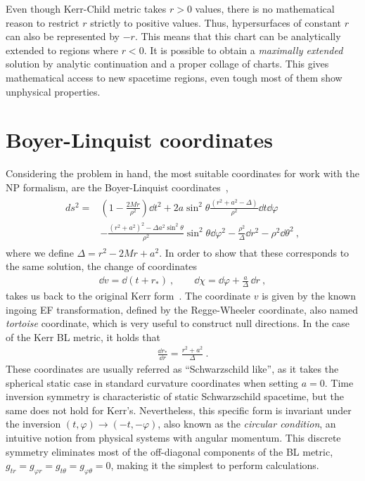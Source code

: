 Even though Kerr-Child metric takes $r>0$ values, there is no mathematical reason to restrict $r$ strictly to positive values.
Thus, hypersurfaces of constant $r$ can also be represented by $-r$. 
This means that this chart can be analytically extended to regions where $r<0$.
It is possible to obtain a \emph{maximally extended} solution by analytic continuation and a proper collage of charts.
This gives mathematical access to new spacetime regions, even tough most of them show unphysical properties.

\section{Boyer-Linquist coordinates}

Considering the problem in hand, the most suitable coordinates for work with the NP formalism, are the Boyer-Linquist coordinates~\cite{Boyer1967},
\begin{align}
    \begin{split}
        ds^2 = & \left(1 - \frac{2 M r}{\rho^2} \right) \dd t^2 + 2 a \sin^2\theta \frac{(r^2+a^2-\Delta)}{\rho^2} \dd t \dd \varphi \\
        &- \frac{(r^2+a^2)^2- \Delta a^2 \sin^2\theta}{\rho^2} \sin^2\theta \dd\varphi^2 - \frac{\rho^2}{\Delta} \dd r^2 - \rho^2 \dd \theta^2 ~,
    \end{split}
    \label{eq2:KerrBL}
\end{align}
where we define $\Delta=r^2-2 M r + a^2$. In order to show that these corresponds to the same solution, the change of coordinates
\begin{align}
    \dd v = \dd ( t + r_* ) ~, \qquad \dd \chi = \dd \varphi + \frac{a}{\Delta} \,\dd r ~,
    \label{eq2:InEFtoBL}
\end{align}
takes us back to the original Kerr form~.
The coordinate $v$ is given by the known ingoing EF transformation, defined by the Regge-Wheeler coordinate, also named \emph{tortoise} coordinate, which is very useful to construct null directions. In the case of the Kerr BL metric, it holds that
\begin{align}
    \frac{\dd r_*}{\dd r} = \frac{r^2+a^2}{\Delta} ~.
    \label{eq2:tortoise}
\end{align}
These coordinates are usually referred as ``Schwarzschild like'', as it takes the spherical static case in standard curvature coordinates when setting $a=0$. 
Time inversion symmetry is characteristic of static Schwarzschild spacetime, but the same does not hold for Kerr's.
Nevertheless, this specific form is invariant under the inversion $(t,\varphi)\to(-t,-\varphi)$, also known as the \emph{circular condition}, an intuitive notion from physical systems with angular momentum.
This discrete symmetry eliminates most of the off-diagonal components of the BL metric, $g_{tr} = g_{\varphi r} = g_{t \theta} = g_{\varphi \theta} = 0$, making it the simplest to perform calculations.

